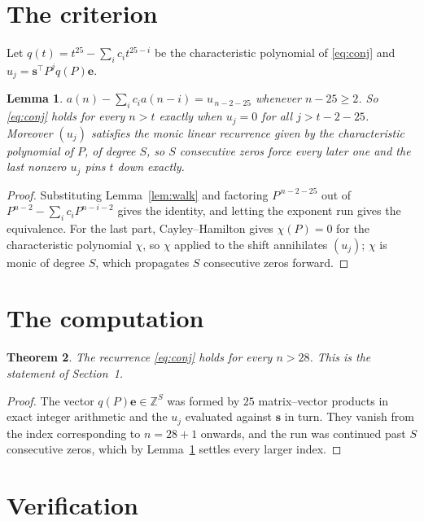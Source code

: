 \documentclass[11pt,a4paper]{article}
\theoremstyle{plain}
\newtheorem{theorem}{Theorem}
\newtheorem{lemma}[theorem]{Lemma}
\theoremstyle{definition}
\begin{document}
\section{The criterion}

Let $q(t)=t^{25}-\sum_i c_i t^{25-i}$ be the characteristic polynomial of
\eqref{eq:conj} and $u_j=\mathbf{s}^{\!\top}P^{j}q(P)\mathbf{e}$.

\begin{lemma}\label{lem:crit}
$a(n)-\sum_i c_i a(n-i)=u_{\,n-2-25}$ whenever $n-25\ge2$. So \eqref{eq:conj}
holds for every $n>t$ exactly when $u_j=0$ for all $j>t-2-25$. Moreover $(u_j)$
satisfies the monic linear recurrence given by the characteristic polynomial of $P$, of
degree $S$, so $S$ consecutive zeros force every later one and the last nonzero $u_j$ pins
$t$ down exactly.
\end{lemma}

\begin{proof}
Substituting Lemma~\ref{lem:walk} and factoring $P^{\,n-2-25}$ out of
$P^{n-2}-\sum_i c_i P^{n-i-2}$ gives the identity, and letting the exponent run gives the
equivalence. For the last part, Cayley--Hamilton gives $\chi(P)=0$ for the characteristic
polynomial $\chi$, so $\chi$ applied to the shift annihilates $(u_j)$; $\chi$ is monic of
degree $S$, which propagates $S$ consecutive zeros forward.
\end{proof}

\section{The computation}

\begin{theorem}
The recurrence \eqref{eq:conj} holds for every $n>28$. This is the statement of
Section~1.
\end{theorem}

\begin{proof}
The vector $q(P)\mathbf{e}\in\mathbb{Z}^{S}$ was formed by $25$ matrix--vector
products in exact integer arithmetic and the $u_j$ evaluated against $\mathbf{s}$ in turn.
They vanish from the index corresponding to $n=28+1$ onwards, and the run was continued
past $S$ consecutive zeros, which by Lemma~\ref{lem:crit} settles every larger index.
\end{proof}

\section{Verification}
\end{document}
